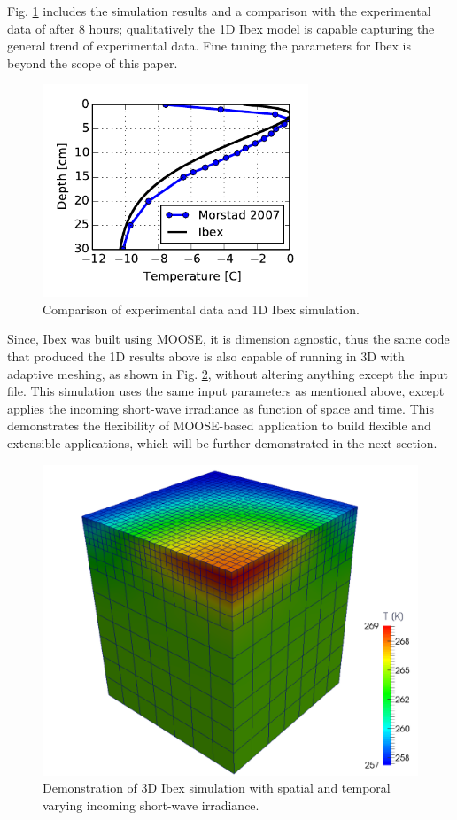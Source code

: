 Fig. \ref{fig:ibex_1d} includes the simulation results and a comparison with the experimental data of \citet{morstad2007experimental} after 8 hours; qualitatively the 1D Ibex model is capable capturing the general trend of experimental data. Fine tuning the parameters for Ibex is beyond the scope of this paper.

\begin{figure}[H]
  \includegraphics[width=3.125in]{figures/ibex.pdf}
  \caption{Comparison of experimental data and 1D Ibex simulation.}
  \label{fig:ibex_1d}
\end{figure}

Since, Ibex was built using MOOSE, it is dimension agnostic, thus the same code that produced the 1D results above is also capable of running in 3D with adaptive meshing, as shown in Fig. \ref{fig:ibex_3d}, without altering anything except the input file. This simulation uses the same input parameters as mentioned above, except applies the incoming short-wave irradiance as function of space and time. This demonstrates the flexibility of MOOSE-based application to build flexible and extensible applications, which will be further demonstrated in the next section.

\begin{figure}
  \includegraphics[width=\linewidth]{figures/ibex3d.pdf}
  \caption{Demonstration of 3D Ibex simulation with spatial and temporal varying incoming short-wave irradiance.}
  \label{fig:ibex_3d}
\end{figure}

